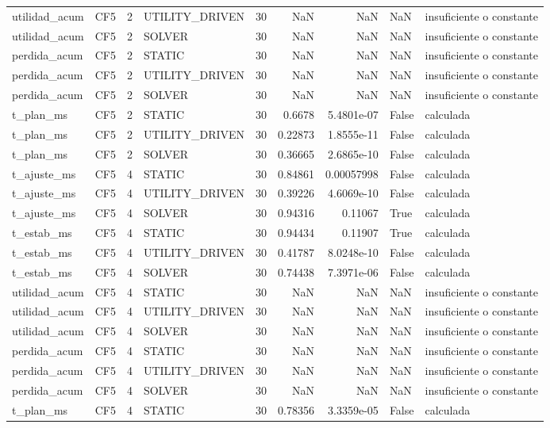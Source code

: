 \begin{tabular}{llrlrrrll}
utilidad_acum & CF5 & 2 & UTILITY_DRIVEN & 30 & NaN & NaN & NaN & insuficiente o constante \\
utilidad_acum & CF5 & 2 & SOLVER & 30 & NaN & NaN & NaN & insuficiente o constante \\
perdida_acum & CF5 & 2 & STATIC & 30 & NaN & NaN & NaN & insuficiente o constante \\
perdida_acum & CF5 & 2 & UTILITY_DRIVEN & 30 & NaN & NaN & NaN & insuficiente o constante \\
perdida_acum & CF5 & 2 & SOLVER & 30 & NaN & NaN & NaN & insuficiente o constante \\
t_plan_ms & CF5 & 2 & STATIC & 30 & 0.6678 & 5.4801e-07 & False & calculada \\
t_plan_ms & CF5 & 2 & UTILITY_DRIVEN & 30 & 0.22873 & 1.8555e-11 & False & calculada \\
t_plan_ms & CF5 & 2 & SOLVER & 30 & 0.36665 & 2.6865e-10 & False & calculada \\
t_ajuste_ms & CF5 & 4 & STATIC & 30 & 0.84861 & 0.00057998 & False & calculada \\
t_ajuste_ms & CF5 & 4 & UTILITY_DRIVEN & 30 & 0.39226 & 4.6069e-10 & False & calculada \\
t_ajuste_ms & CF5 & 4 & SOLVER & 30 & 0.94316 & 0.11067 & True & calculada \\
t_estab_ms & CF5 & 4 & STATIC & 30 & 0.94434 & 0.11907 & True & calculada \\
t_estab_ms & CF5 & 4 & UTILITY_DRIVEN & 30 & 0.41787 & 8.0248e-10 & False & calculada \\
t_estab_ms & CF5 & 4 & SOLVER & 30 & 0.74438 & 7.3971e-06 & False & calculada \\
utilidad_acum & CF5 & 4 & STATIC & 30 & NaN & NaN & NaN & insuficiente o constante \\
utilidad_acum & CF5 & 4 & UTILITY_DRIVEN & 30 & NaN & NaN & NaN & insuficiente o constante \\
utilidad_acum & CF5 & 4 & SOLVER & 30 & NaN & NaN & NaN & insuficiente o constante \\
perdida_acum & CF5 & 4 & STATIC & 30 & NaN & NaN & NaN & insuficiente o constante \\
perdida_acum & CF5 & 4 & UTILITY_DRIVEN & 30 & NaN & NaN & NaN & insuficiente o constante \\
perdida_acum & CF5 & 4 & SOLVER & 30 & NaN & NaN & NaN & insuficiente o constante \\
t_plan_ms & CF5 & 4 & STATIC & 30 & 0.78356 & 3.3359e-05 & False & calculada \\

\end{tabular}
